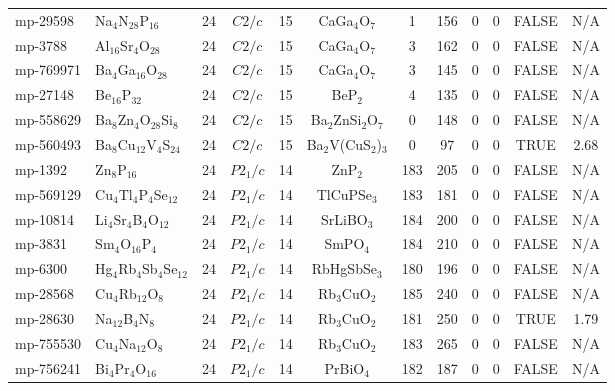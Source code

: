 {\begin{longtable}{llcccccccccc}
    mp-29598 & Na$_{4}$N$_{28}$P$_{16}$ & 24    & $C2/c$ & 15    & CaGa$_{4}$O$_{7}$ & 1     & 156   & 0     & 0     & FALSE & N/A \\
    mp-3788 & Al$_{16}$Sr$_{4}$O$_{28}$ & 24    & $C2/c$ & 15    & CaGa$_{4}$O$_{7}$ & 3     & 162   & 0     & 0     & FALSE & N/A \\
    mp-769971 & Ba$_{4}$Ga$_{16}$O$_{28}$ & 24    & $C2/c$ & 15    & CaGa$_{4}$O$_{7}$ & 3     & 145   & 0     & 0     & FALSE & N/A \\
    mp-27148 & Be$_{16}$P$_{32}$ & 24    & $C2/c$ & 15    & BeP$_{2}$ & 4     & 135   & 0     & 0     & FALSE & N/A \\
    mp-558629 & Ba$_{8}$Zn$_{4}$O$_{28}$Si$_{8}$ & 24    & $C2/c$ & 15    & Ba$_{2}$ZnSi$_{2}$O$_{7}$ & 0     & 148   & 0     & 0     & FALSE & N/A \\
    mp-560493 & Ba$_{8}$Cu$_{12}$V$_{4}$S$_{24}$ & 24    & $C2/c$ & 15    & Ba$_{2}$V(CuS$_{2}$)$_{3}$ & 0     & 97    & 0     & 0     & TRUE  & 2.68  \\
    mp-1392 & Zn$_{8}$P$_{16}$ & 24    & $P2_1/c$ & 14    & ZnP$_{2}$ & 183   & 205   & 0     & 0     & FALSE & N/A \\
    mp-569129 & Cu$_{4}$Tl$_{4}$P$_{4}$Se$_{12}$ & 24    & $P2_1/c$ & 14    & TlCuPSe$_{3}$ & 183   & 181   & 0     & 0     & FALSE & N/A \\
    mp-10814 & Li$_{4}$Sr$_{4}$B$_{4}$O$_{12}$ & 24    & $P2_1/c$ & 14    & SrLiBO$_{3}$ & 184   & 200   & 0     & 0     & FALSE & N/A \\
    mp-3831 & Sm$_{4}$O$_{16}$P$_{4}$ & 24    & $P2_1/c$ & 14    & SmPO$_{4}$ & 184   & 210   & 0     & 0     & FALSE & N/A \\
    mp-6300 & Hg$_{4}$Rb$_{4}$Sb$_{4}$Se$_{12}$ & 24    & $P2_1/c$ & 14    & RbHgSbSe$_{3}$ & 180   & 196   & 0     & 0     & FALSE & N/A \\
    mp-28568 & Cu$_{4}$Rb$_{12}$O$_{8}$ & 24    & $P2_1/c$ & 14    & Rb$_{3}$CuO$_{2}$ & 185   & 240   & 0     & 0     & FALSE & N/A \\
    mp-28630 & Na$_{12}$B$_{4}$N$_{8}$ & 24    & $P2_1/c$ & 14    & Rb$_{3}$CuO$_{2}$ & 181   & 250   & 0     & 0     & TRUE  & 1.79  \\
    mp-755530 & Cu$_{4}$Na$_{12}$O$_{8}$ & 24    & $P2_1/c$ & 14    & Rb$_{3}$CuO$_{2}$ & 183   & 265   & 0     & 0     & FALSE & N/A \\
    mp-756241 & Bi$_{4}$Pr$_{4}$O$_{16}$ & 24    & $P2_1/c$ & 14    & PrBiO$_{4}$ & 182   & 187   & 0     & 0     & FALSE & N/A \\

\end{longtable}}
